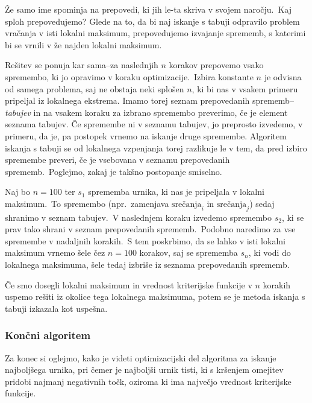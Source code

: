 \documentclass[a4paper,10pt]{article}
\begin{document}
Že samo ime spominja na prepovedi, ki jih le-ta skriva v svojem naročju.\ Kaj sploh prepovedujemo?
Glede na to, da bi naj iskanje s tabuji odpravilo problem vračanja v isti lokalni maksimum,
prepovedujemo izvajanje sprememb, s katerimi bi se vrnili v že najden lokalni maksimum.

Rešitev se ponuja kar sama--za naslednjih \(n\) korakov prepovemo vsako spremembo, ki jo
opravimo v koraku optimizacije.\ Izbira konstante \(n\) je odvisna od samega problema, saj
ne obstaja neki splošen \(n\), ki bi nas v vsakem primeru pripeljal iz lokalnega ekstrema.
Imamo torej seznam prepovedanih sprememb--\emph{tabujev} in na vsakem koraku za izbrano
spremembo preverimo, če je element seznama tabujev. Če spremembe ni v seznamu tabujev, jo
preprosto izvedemo, v primeru, da je, pa postopek vrnemo na iskanje druge spremembe.
Algoritem iskanja s tabuji se od lokalnega vzpenjanja torej razlikuje le v tem, da pred
izbiro spremembe preveri, če je vsebovana v seznamu prepovedanih sprememb.\ Poglejmo, zakaj
je takšno postopanje smiselno.

Naj bo \(n = 100\) ter \(s_1\) sprememba urnika, ki nas je pripeljala v lokalni maksimum.\ To
spremembo (npr.\ zamenjava \(\textrm{srečanja}_i\) in \(\textrm{srečanja}_j\)) sedaj shranimo v
seznam tabujev.\ V naslednjem koraku izvedemo spremembo \(s_2\), ki se prav tako shrani v
seznam prepovedanih sprememb.\ Podobno naredimo za vse spremembe v nadaljnih korakih.\ S
tem poskrbimo, da se lahko v isti lokalni maksimum vrnemo šele čez \(n = 100\) korakov, saj
se sprememba \(s_n\), ki vodi do lokalnega maksimuma, šele tedaj izbriše iz seznama
prepovedanih sprememb.

Če smo dosegli lokalni maksimum in vrednost kriterijske funkcije v \(n\) korakih uspemo
rešiti iz okolice tega lokalnega maksimuma, potem se je metoda iskanja s tabuji izkazala
kot uspešna.

\subsubsection{Končni algoritem}

Za konec si oglejmo, kako je videti optimizacijski del algoritma za iskanje najboljšega
urnika, pri čemer je najboljši urnik tisti, ki s kršenjem omejitev pridobi najmanj negativnih
točk, oziroma ki ima največjo vrednost kriterijske funkcije.
\end{document}

